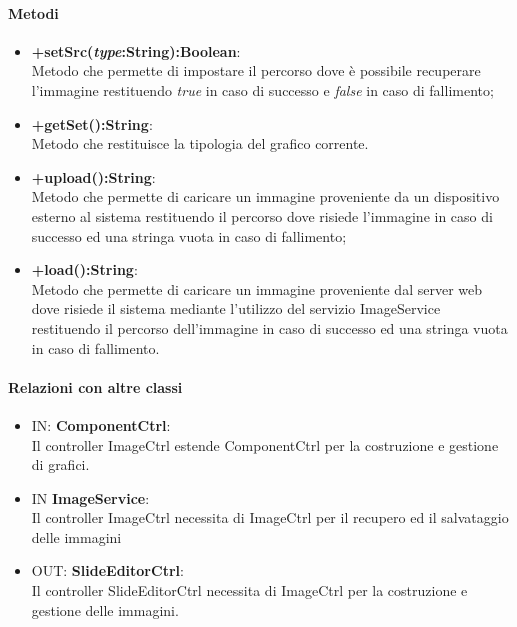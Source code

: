 	\paragraph{Metodi}
	\begin{itemize}
	\item \textbf{+setSrc(\textit{type}:String):Boolean}:\\
		Metodo che permette di impostare il percorso dove è possibile recuperare l'immagine restituendo \textit{true} in caso di successo e \textit{false} in caso di fallimento;
	\item \textbf{+getSet():String}:\\
		Metodo che restituisce la tipologia del grafico corrente.
	\item \textbf{+upload():String}:\\	
		Metodo che permette di caricare un immagine proveniente da un dispositivo esterno al sistema restituendo il percorso dove risiede l'immagine in caso di successo ed una stringa vuota in caso di fallimento;
	\item \textbf{+load():String}:\\	
		Metodo che permette di caricare un immagine proveniente dal server web dove risiede il sistema mediante l'utilizzo del servizio ImageService restituendo il percorso dell'immagine in caso di successo ed una stringa vuota in caso di fallimento.	
	
	\end{itemize}
	\paragraph{Relazioni con altre classi}
	\begin{itemize}
 	\item IN: \textbf{ComponentCtrl}:\\
	 	Il controller ImageCtrl estende ComponentCtrl per la costruzione e gestione di grafici.
	\item IN \textbf{ImageService}:\\
		Il controller ImageCtrl necessita di ImageCtrl per il recupero ed il salvataggio delle immagini
	\item OUT: \textbf{SlideEditorCtrl}:\\
		Il controller SlideEditorCtrl necessita di ImageCtrl per la costruzione e gestione delle immagini. 	
	\end{itemize}


